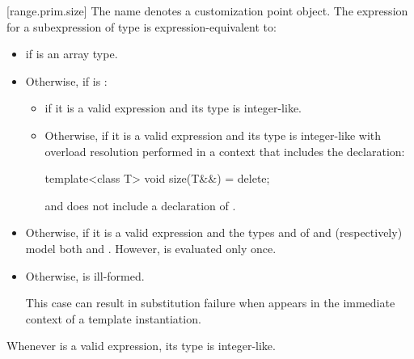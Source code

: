[range.prim.size]{}
\pnum
The name  denotes a customization point
object. The expression
 for a subexpression  of type
 is expression-equivalent to:
\begin{itemize}
\item
   if  is an array
  type.

\item
  Otherwise, if
  is :
  \begin{itemize}
  \item
    if it is a valid expression and its type 
    is integer-like.

  \item
    Otherwise, 
    if it is a valid expression and its type 
    is integer-like
    with overload resolution performed in a context that includes
    the declaration:
\begin{codeblock}
template<class T> void size(T&&) = delete;
\end{codeblock}
    and does not include a declaration of .
  \end{itemize}

\item
  Otherwise, 
  if it is a valid expression and
  the types  and  of  and
   (respectively) model both
   and
  .
  However,  is evaluated only once.

\item
  Otherwise,  is ill-formed.
  \begin{note}
  This case can result in substitution failure when 
  appears in the immediate context of a template instantiation.
  \end{note}
\end{itemize}

\pnum
\begin{note}
Whenever  is a valid expression, its
type is integer-like.
\end{note}

